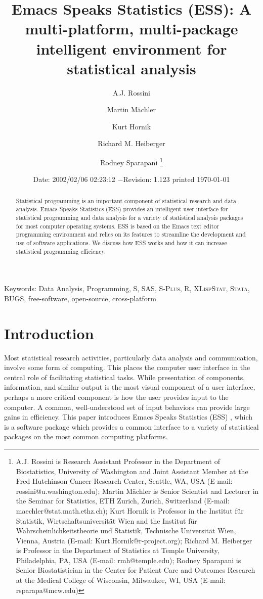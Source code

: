 \documentclass{article}
\title{Emacs Speaks Statistics (ESS): A multi-platform, multi-package
intelligent environment for statistical analysis}
\author{A.J. Rossini \and Martin M{\"a}chler \and Kurt Hornik \and Richard
  M. Heiberger \and Rodney Sparapani \footnote{%
    A.J. Rossini is Research Assistant Professor in the Department of
    Biostatistics, University of Washington and Joint Assistant Member at
    the Fred Hutchinson Cancer Research Center, Seattle, WA, USA
    (E-mail: rossini@u.washington.edu);
    Martin M{\"a}chler is Senior Scientist and Lecturer in the Seminar for
    Statistics, ETH Zurich, Zurich, Switzerland
    (E-mail: maechler@stat.math.ethz.ch);
    Kurt Hornik is Professor in the Institut f{\"u}r Statistik,
    Wirtschaftsuniversit{\"a}t Wien and the Institut f{\"u}r
    Wahrscheinlichkeitstheorie und Statistik, Technische Universit{\"a}t
    Wien, Vienna, Austria (E-mail: Kurt.Hornik@r-project.org);
    Richard M. Heiberger is Professor in the Department of Statistics at
    Temple University, Philadelphia, PA, USA (E-mail: rmh@temple.edu);
    Rodney Sparapani is Senior Biostatistician in the Center for Patient
    Care and Outcomes Research at the Medical College of Wisconsin, 
    Milwaukee, WI, USA (E-mail: rsparapa@mcw.edu)}}
\date{$ $Date: 2002/02/06 02:23:12 $ - $Revision: 1.123 $ $\tiny printed \today}
\newif\ifdraft
\renewcommand{\baselinestretch}{1.5}
\newcommand*{\SAS}{\textsc{SAS}}
\newcommand*{\Splus}{\textsc{S-Plus}}
\newcommand*{\XLispStat}{\textsc{XLispStat}}
\newcommand*{\Stata}{\textsc{Stata}}
\begin{document}

\ifdraft
\setcounter{page}{0}
\tableofcontents
\fi

\maketitle

\ifdraft{}%
\else%
 \renewcommand{\baselinestretch}{1.5}
\fi

\begin{abstract}
  Statistical programming is an important component of statistical
  research and data analysis.  Emacs Speaks Statistics (ESS) provides
  an intelligent user interface for statistical programming and data
  analysis for a variety of statistical analysis packages for most
  computer operating systems.  ESS is based on the Emacs text editor
  programming environment and relies on its features to streamline the
  development and use of software applications.  We discuss how ESS
  works and how it can increase statistical programming efficiency.
\end{abstract}

\noindent Keywords: Data Analysis, Programming, 
S, \SAS, \Splus, R, \XLispStat, \Stata, BUGS, free-software,
open-source, cross-platform

\section{Introduction}
\label{sec:introduction}

Most statistical research activities, particularly data analysis and
communication, involve some form of computing.  This places the
computer user interface in the central role of facilitating
statistical tasks.  While presentation of components, information, and
similar output is the most visual component of a user interface,
perhaps a more critical component is how the user provides input to
the computer.  A common, well-understood set of input behaviors can
provide large gains in efficiency.  This paper introduces Emacs Speaks
Statistics (ESS) \citep{ESS}, which is a software package which
provides a common interface to a variety of statistical packages on
the most common computing platforms.
\end{document}
